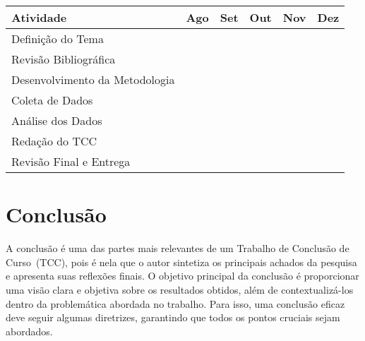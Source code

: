 \documentclass[
    12pt
    ,oneside
    ,a4paper
    ,chapter=TITLE
    ,section=TITLE
    ,sumario=abnt-6027-2012]{abntex2}
\begin{document}
\begin{quadro}[h]
    \begin{tabular}{|p{7cm}|c|c|c|c|c|}
        \hline
        \textbf{Atividade}                      & \textbf{Ago} & \textbf{Set} & \textbf{Out} & \textbf{Nov} & \textbf{Dez} \\
        \hline\hline
        Definição do Tema                      & \cellcolor{black}  &  &  &  &  \\\hline
        Revisão Bibliográfica                  & \cellcolor{black}  & \cellcolor{black}  &  &  &  \\\hline
        Desenvolvimento da Metodologia         &  & \cellcolor{black}  & \cellcolor{black}  &  &  \\\hline
        Coleta de Dados                        &  &  & \cellcolor{black}  & \cellcolor{black}  &  \\\hline
        Análise dos Dados                      &  &  &  & \cellcolor{black}  & \cellcolor{black}  \\\hline
        Redação do TCC                        &  &  &  & \cellcolor{black}  & \cellcolor{black}  \\\hline
        Revisão Final e Entrega                &  &  &  &  & \cellcolor{black}  \\
        \hline
    \end{tabular}
    \vspace{0.2cm}
    \fonteautor
\end{quadro}




\chapter{Conclusão}
\label{cap:conclusao}

A conclusão é uma das partes mais relevantes de um Trabalho de Conclusão de Curso~(TCC), pois é nela que o autor sintetiza os principais achados da pesquisa e apresenta suas reflexões finais. O objetivo principal da conclusão é proporcionar uma visão clara e objetiva sobre os resultados obtidos, além de contextualizá-los dentro da problemática abordada no trabalho. Para isso, uma conclusão eficaz deve seguir algumas diretrizes, garantindo que todos os pontos cruciais sejam abordados.
\end{document}
